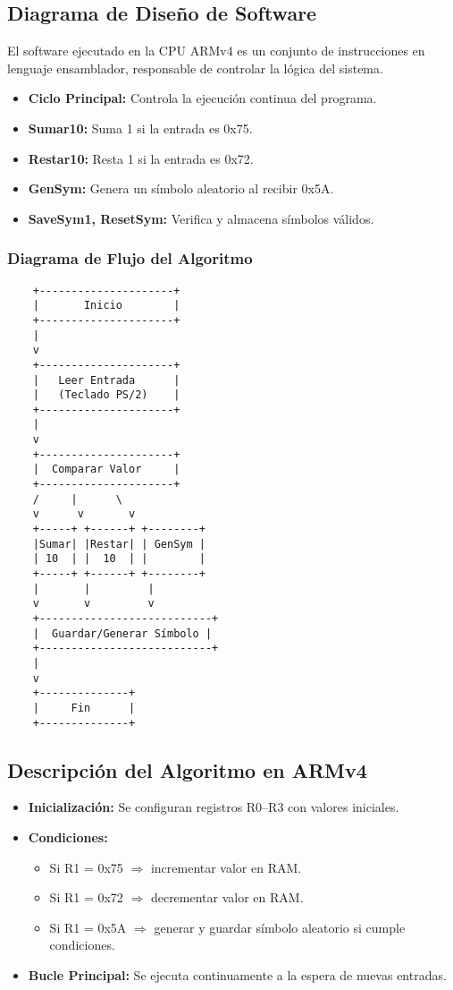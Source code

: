 \documentclass[conference]{IEEEtran}
\begin{document}
\subsection*{Diagrama de Diseño de Software}

El software ejecutado en la CPU ARMv4 es un conjunto de instrucciones en lenguaje ensamblador, responsable de controlar la lógica del sistema.

\begin{itemize}
	\item \textbf{Ciclo Principal:} Controla la ejecución continua del programa.
	\item \textbf{Sumar10:} Suma 1 si la entrada es 0x75.
	\item \textbf{Restar10:} Resta 1 si la entrada es 0x72.
	\item \textbf{GenSym:} Genera un símbolo aleatorio al recibir 0x5A.
	\item \textbf{SaveSym1, ResetSym:} Verifica y almacena símbolos válidos.
\end{itemize}

\subsubsection*{Diagrama de Flujo del Algoritmo}

\begin{verbatim}
	+---------------------+
	|       Inicio        |
	+---------------------+
	|
	v
	+---------------------+
	|   Leer Entrada      |
	|   (Teclado PS/2)    |
	+---------------------+
	|
	v
	+---------------------+
	|  Comparar Valor     |
	+---------------------+
	/     |      \
	v      v       v
	+-----+ +------+ +--------+
	|Sumar| |Restar| | GenSym |
	| 10  | |  10  | |        |
	+-----+ +------+ +--------+
	|       |         |
	v       v         v
	+---------------------------+
	|  Guardar/Generar Símbolo |
	+---------------------------+
	|
	v
	+--------------+
	|     Fin      |
	+--------------+
\end{verbatim}

\subsection*{Descripción del Algoritmo en ARMv4}

\begin{itemize}
	\item \textbf{Inicialización:} Se configuran registros R0–R3 con valores iniciales.
	\item \textbf{Condiciones:}
	\begin{itemize}
		\item Si R1 = 0x75 $\Rightarrow$ incrementar valor en RAM.
		\item Si R1 = 0x72 $\Rightarrow$ decrementar valor en RAM.
		\item Si R1 = 0x5A $\Rightarrow$ generar y guardar símbolo aleatorio si cumple condiciones.
	\end{itemize}
	\item \textbf{Bucle Principal:} Se ejecuta continuamente a la espera de nuevas entradas.
\end{itemize}
\end{document}
